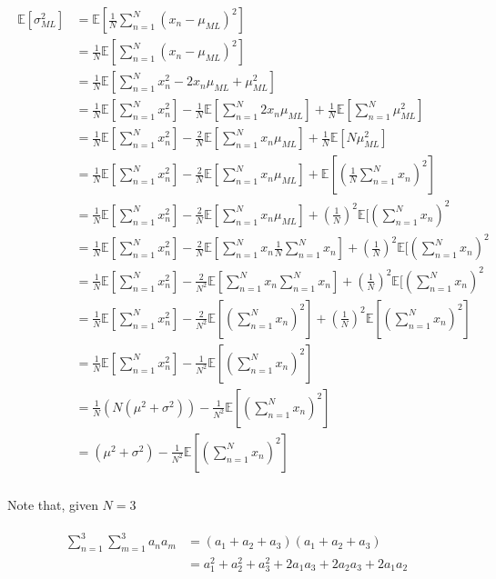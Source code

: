 \begin{align}
    \begin{split}
        \mathbb{E}[\sigma^2_{ML}] & = \mathbb{E}[\frac{1}{N}\sum_{n=1}^N (x_n - \mu_{ML})^2]\\
        & = \frac{1}{N}\mathbb{E}[\sum_{n=1}^N (x_n - \mu_{ML})^2]\\
        & = \frac{1}{N}\mathbb{E}[\sum_{n=1}^N x_n^2 - 2x_n\mu_{ML} + \mu_{ML}^2]\\
        & = \frac{1}{N}\mathbb{E}[\sum_{n=1}^N x_n^2] - \frac{1}{N}\mathbb{E}[\sum_{n=1}^N 2x_n\mu_{ML}] + \frac{1}{N}\mathbb{E}[\sum_{n=1}^N\mu_{ML}^2]\\
        & = \frac{1}{N}\mathbb{E}[\sum_{n=1}^N x_n^2] - \frac{2}{N}\mathbb{E}[\sum_{n=1}^N x_n\mu_{ML}] + \frac{1}{N}\mathbb{E}[N\mu_{ML}^2]\\
        & = \frac{1}{N}\mathbb{E}[\sum_{n=1}^N x_n^2] - \frac{2}{N}\mathbb{E}[\sum_{n=1}^Nx_n\mu_{ML}] + \mathbb{E}[(\frac{1}{N} \sum_{n=1}^N x_n)^2]\\
        & = \frac{1}{N}\mathbb{E}[\sum_{n=1}^N x_n^2] - \frac{2}{N}\mathbb{E}[\sum_{n=1}^Nx_n\mu_{ML}] + (\frac{1}{N})^2 \mathbb{E}[(\sum_{n=1}^N x_n)^2\\
        & = \frac{1}{N}\mathbb{E}[\sum_{n=1}^N x_n^2] - \frac{2}{N}\mathbb{E}[\sum_{n=1}^Nx_n \frac{1}{N}\sum_{n=1}^Nx_n] + (\frac{1}{N})^2 \mathbb{E}[(\sum_{n=1}^N x_n)^2\\
        & = \frac{1}{N}\mathbb{E}[\sum_{n=1}^N x_n^2] - \frac{2}{N^2}\mathbb{E}[\sum_{n=1}^Nx_n \sum_{n=1}^Nx_n] + (\frac{1}{N})^2 \mathbb{E}[(\sum_{n=1}^N x_n)^2\\
        & = \frac{1}{N}\mathbb{E}[\sum_{n=1}^N x_n^2] - \frac{2}{N^2}\mathbb{E}[(\sum_{n=1}^Nx_n)^2] + (\frac{1}{N})^2 \mathbb{E}[(\sum_{n=1}^N x_n)^2]\\
        & = \frac{1}{N}\mathbb{E}[\sum_{n=1}^N x_n^2] - \frac{1}{N^2}\mathbb{E}[(\sum_{n=1}^Nx_n)^2]\\
        & = \frac{1}{N}(N(\mu^2 + \sigma^2)) - \frac{1}{N^2}\mathbb{E}[(\sum_{n=1}^Nx_n)^2]\\
        & = (\mu^2 + \sigma^2) - \frac{1}{N^2}\mathbb{E}[(\sum_{n=1}^Nx_n)^2]\\
    \end{split}
\end{align}

Note that, given $N = 3$

\begin{align}
    \begin{split}
        \sum_{n=1}^3\sum_{m=1}^3 a_na_m & = (a_1 + a_2 + a_3)(a_1 + a_2 + a_3)\\
        & = a_1^2 + a_2^2 + a_3^2 + 2a_1a_3 + 2a_2a_3 + 2a_1a_2\\
    \end{split}
\end{align}

